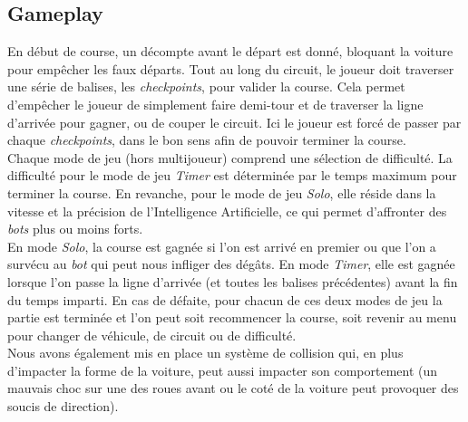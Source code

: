 \documentclass[12pt,a4paper]{article}
\newcommand{\AI}{Intelligence Artificielle}
\begin{document}
        \clearpage

        \subsection{Gameplay}
            En début de course, un décompte avant le départ est donné, bloquant la voiture pour
            empêcher les faux départs. Tout au long du circuit, le joueur doit traverser une série de 
            balises, les \textit{checkpoints}, pour valider la course. Cela permet d'empêcher le 
            joueur de simplement faire demi-tour et de traverser la ligne d'arrivée pour gagner, ou
            de couper le circuit. Ici le joueur est forcé de passer par chaque \textit{checkpoints},
            dans le bon sens afin de pouvoir terminer la course.\\
            Chaque mode de jeu (hors multijoueur) comprend une sélection de difficulté.
            La difficulté pour le mode de jeu \textsl{Timer} est déterminée par le temps maximum pour 
            terminer la course. En revanche, pour le mode de jeu \textsl{Solo}, 
            elle réside dans la vitesse et la précision de l'\AI, ce qui permet d'affronter des 
            \textit{bots} plus ou moins forts. \\
            En mode \textsl{Solo}, la course est gagnée si l'on est arrivé en premier ou que l'on a 
            survécu au \textit{bot} qui peut nous infliger des dégâts. En mode \textsl{Timer}, elle 
            est gagnée lorsque l'on passe la ligne d'arrivée (et toutes les balises précédentes) avant
            la fin du temps imparti. En cas de défaite, pour chacun de ces deux modes de jeu la partie
            est terminée et l'on peut soit recommencer la course, soit revenir au menu pour changer de
            véhicule, de circuit ou de difficulté.\\
            Nous avons également mis en place un système de collision qui, en plus d'impacter la forme de 
            la voiture, peut aussi impacter son comportement (un mauvais choc sur une des roues avant ou 
            le coté de la voiture peut provoquer des soucis de direction).
\end{document}
